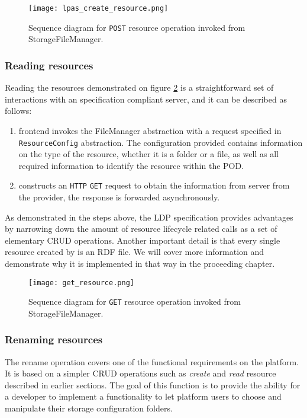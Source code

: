 \begin{figure}[h]
\centering
\texttt{[image: lpas\_create\_resource.png]}
\caption{Sequence diagram for \texttt{POST} resource operation invoked from StorageFileManager.}
\label{fig:lpas_create_resource}
\end{figure}

\subsubsection{Reading resources}

Reading the resources demonstrated on figure \ref{fig:lps_get_resource_sequence} is a straightforward set of interactions with an \solid{} specification compliant server, and it can be described as follows:

\begin{enumerate}
    \item \lpa{} frontend invokes the FileManager abstraction with a request specified in \texttt{ResourceConfig} abstraction. The configuration provided contains information on the type of the resource, whether it is a folder or a file, as well as all required information to identify the resource within the POD.
    \item \lpas{} constructs an \texttt{HTTP} \texttt{GET} request to obtain the information from \solid{} server from the provider, the response is forwarded asynchronously.
\end{enumerate}


As demonstrated in the steps above, the LDP specification provides advantages by narrowing down the amount of resource lifecycle related calls as a set of elementary CRUD operations. Another important detail is that every single resource created by \lpas{} is an RDF file. We will cover more information and demonstrate why it is implemented in that way in the proceeding chapter.  
 
\begin{figure}[h]
\centering
\texttt{[image: get\_resource.png]}
\caption{Sequence diagram for \texttt{GET} resource operation invoked from StorageFileManager.}
\label{fig:lps_get_resource_sequence}
\end{figure}

\subsubsection{Renaming resources}
\label{ssssec:renaming_resources}

The rename operation covers one of the functional requirements on the \lpa{} platform. It is based on a simpler CRUD operations such as \textit{create} and \textit{read} resource described in earlier sections. The goal of this function is to provide the ability for a \lpa{} developer to implement a functionality to let \lpa{} platform users to choose and manipulate their storage configuration folders.

